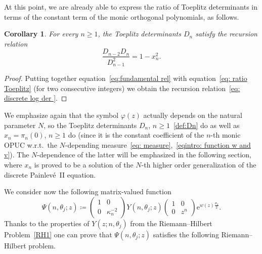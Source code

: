 \documentclass[pdftex]{sigma}%
\numberwithin{equation}{section}
\newtheorem{Corollary}[Theorem]{Corollary}
\def\e{\mathrm{e}}
\begin{document}
At this point, we are already able to express the ratio of Toeplitz determinants in terms of the constant term of the monic orthogonal polynomials, as follows.

	\begin{Corollary}\label{cor:toeplitz recursion relation xn} For every $n\geq 1$, the Toeplitz determinants $D_n$ satisfy the recursion relation
	\begin{equation}\label{eq: discrete log der }
		\frac{D_{n-2}D_{n }}{D_{n-1}^2} = 1-x_n^2.
	\end{equation}
	\end{Corollary}

\begin{proof}
	Putting together equation~\eqref{eq:fundamental rel} with equation~\eqref{eq: ratio Toeplitz} (for two consecutive integers) we obtain the recursion relation~\eqref{eq: discrete log der }.
\end{proof}

We emphasize again that the symbol $\varphi(z)$ actually depends on the natural parameter $N$, so the Toeplitz determinants $D_n$, $n \geq 1$~\eqref{def:Dn} do as well as $x_n=\pi_n(0)$, $n \geq 1$ do (since it is the constant coefficient of the $n$-th monic OPUC w.r.t.\ the $N$-depending measure~\eqref{eq: measure},~\eqref{eqintro: function w and v}). The $N$-dependence of the latter will be emphasized in the following section, where $x_n$ is proved to be a solution of the $N$-th higher order generalization of the discrete Painlev\'e~II equation.
	
	We consider now the following matrix-valued function
	\begin{equation}
		\label{eq:Psi}
		\Psi(n,\theta_j;z)\coloneqq \begin{pmatrix}
			1&0\\
			0& \kappa_{n}^{-2}
		\end{pmatrix}Y(n,\theta_j;z)\begin{pmatrix}
			1&0\\
			0&z^n
		\end{pmatrix}\e^{w(z)\frac{\sigma_3}{2}}.
	\end{equation}
	Thanks to the properties of $Y(z;n,\theta_j)$ from the Riemann--Hilbert Problem~\ref{RH1} one can prove that $\Psi(n,\theta_j;z)$ satisfies the following Riemann--Hilbert problem.
\end{document}
